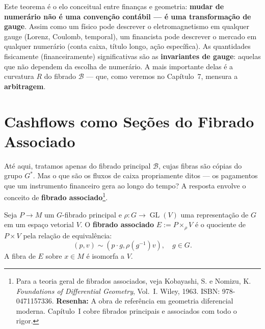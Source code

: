 \begin{obs}
Este teorema \'e o elo conceitual entre finan\c{c}as e geometria:
\textbf{mudar de numer\'ario n\~ao \'e uma conven\c{c}\~ao cont\'abil --- \'e
uma transforma\c{c}\~ao de gauge}. Assim como um f\'isico pode descrever o
eletromagnetismo em qualquer gauge (Lorenz, Coulomb, temporal), um financista
pode descrever o mercado em qualquer numer\'ario (conta caixa, t\'itulo longo,
a\c{c}\~ao espec\'ifica). As quantidades fisicamente (financeiramente)
significativas s\~ao as \textbf{invariantes de gauge}: aquelas que n\~ao
dependem da escolha de numer\'ario. A mais importante delas \'e a curvatura
$R$ do fibrado $\mathcal{B}$ --- que, como veremos no Cap\'itulo~7, mensura
a \textbf{arbitragem}.
\end{obs}

\section{Cashflows como Se\c{c}\~oes do Fibrado Associado}

At\'e aqui, tratamos apenas do fibrado principal $\mathcal{B}$, cujas fibras
s\~ao c\'opias do grupo $G^*$. Mas o que s\~ao os fluxos de caixa propriamente
ditos --- os pagamentos que um instrumento financeiro gera ao longo do tempo?
A resposta envolve o conceito de \textbf{fibrado associado}\footnote{Para a
teoria geral de fibrados associados, veja Kobayashi, S. e Nomizu, K.
\textit{Foundations of Differential Geometry}, Vol.~I. Wiley, 1963.
ISBN: 978-0471157336. \textbf{Resenha:} A obra de refer\^encia em geometria
diferencial moderna. Cap\'itulo~I cobre fibrados principais e associados com
todo o rigor.}.

\begin{defi}\label{def:associado}
Seja $P \to M$ um $G$-fibrado principal e $\rho: G \to \operatorname{GL}(V)$
uma representa\c{c}\~ao de $G$ em um espa\c{c}o vetorial $V$. O
\textbf{fibrado associado} $E := P \times_\rho V$ \'e o quociente de
$P \times V$ pela rela\c{c}\~ao de equival\^encia:
\begin{equation}\label{eq:assoc}
 (p, v) \sim (p \cdot g, \rho(g^{-1}) v), \quad g \in G.
\end{equation}
A fibra de $E$ sobre $x \in M$ \'e isomorfa a $V$.
\end{defi}


